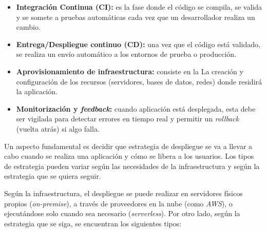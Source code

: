 \begin{itemize}
    \item \textbf{Integración Continua (CI):} es la fase donde el código se compila, se valida y se somete a pruebas automáticas 
    cada vez que un desarrollador realiza un cambio.
    \item \textbf{Entrega/Despliegue continuo (CD):} una vez que el código está validado, se realiza un envío automático a los 
    entornos de prueba o producción.
    \item \textbf{Aprovisionamiento de infraestructura:} consiste en la La creación y configuración de los recursos (servidores, 
    bases de datos, redes) donde residirá la aplicación.
    \item \textbf{Monitorización y \textit{feedback}:} cuando aplicación está desplegada, esta debe ser vigilada para detectar 
    errores en tiempo real y permitir un \textit{rollback} (vuelta atrás) si algo falla.
\end{itemize}

Un aspecto fundamental es decidir que estrategia de despliegue se va a llevar a cabo cuando se realiza una aplicación 
y cómo se libera a los usuarios. Los tipos de estrategia pueden variar según las necesidades de la infraestructura y 
según la estrategia que se quiera seguir. 

Según la infraestructura, el despliegue se puede realizar en servidores físicos propios (\textit{on-premise}), a través 
de proveedores en la nube (como \textit{AWS}), o ejecutándose solo cuando sea necesario (\textit{serverless}). Por otro 
lado, según la estrategia que se siga, se encuentran los siguientes tipos: \cite{tiposDespliegue} 

